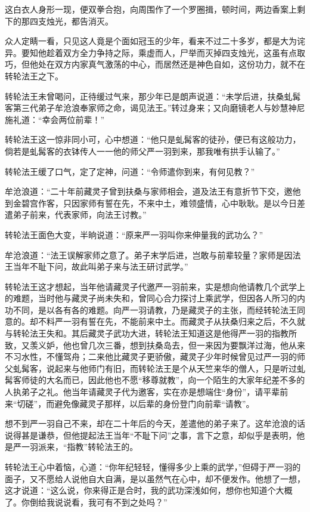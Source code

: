 \documentclass[12pt,oneside]{book}
\begin{document}
这白衣人身形一现，便双拳合抱，向周围作了一个罗圈揖，顿时间，两边香案上剩下的那四支烛光，都告消灭。

众人定睛一看，只见这人竟是个面如冠玉的少年，看来不过二十多岁，都是大为诧异。要知他趁着双方全力争持之际，乘虚而人，尸举而灭掉四支烛光，这虽有点取巧，但他处在双方内家真气激荡的中心，而居然还是神色自如，这份功力，就不在转轮法王之下。

转轮法王未曾喝问，正待缓过气来，那少年已是朗声说道：``未学后进，扶桑虬髯客第三代弟子牟沧浪奉家师之命，谒见法王。''转过身来；又向磨镜老人与妙慧神尼施礼道：``幸会两位前辈！''

转轮法王这一惊非同小可，心中想道：``他只是虬髯客的徒孙，便已有这般功力，倘若是虬髯客的衣钵传人一一他的师父严一羽到来，那我唯有拱手认输了。''

转轮法王缓了口气，定了定神，问道：``令师遣你到来，有何见教？''

牟沧浪道：``二十年前藏灵子曾到扶桑与家师相会，道及法王有意折节下交，邀他到金碧宫作客，只因家师有誓在先，不来中土，难领盛情，心中耿耿。是以今日差遣弟子前来，代表家师，向法王讨教。''

转轮法王面色大变，半晌说道：``原来严一羽叫你来伸量我的武功么？''

牟沧浪道：``法王误解家师之意了。弟子末学后进，岂敢与前辈较量？家师是因法王当年不耻下问，故此叫弟子来与法王研讨武学。''

转轮法王这才想起，当年他请藏灵子代邀严一羽前来，实是想向他请教几个武学上的难题，当时他与藏灵子尚未失和，曾同心合力探讨上乘武学，但因各人所习的内功不同，是以各有各的难题。向严一羽请教，乃是藏灵子的主张，而经转轮法王同意的。却不料严一羽有誓在先，不能前来中土。而藏灵子从扶桑归来之后，不久就与转轮法王失和。其后藏灵子武功大进，转轮法王知道这是他得严一羽的指教所致，又羡义妒，他也曾几次三番，想到扶桑岛去，但一来因为要飘洋过海，他从来不习水性，不懂驾舟；二来他比藏灵子更骄傲，藏灵子少年时候曾见过严一羽的师父虬髯客，说起来与他师门有旧，而转轮法王是个从天竺来华的僧人，只是听过虬髯客师徒的大名而已，因此他也不愿``移尊就教''，向一个陌生的大家年纪差不多的人执弟子之礼。他当年请藏灵子代为邀客，实在亦是想端住``身份''，请平辈前来``切磋''，而避免像藏灵子那样，以后辈的身份登门向前辈``请教''。

想不到严一羽自己不来，却在二十年后的今天，差遣他的弟子来了。这牟沧浪的话说得甚是谦恭，但他提起法王当年``不耻下问''之事，言下之意，却似乎是表明，他是严一羽派来，``指教''转轮法王的。

转轮法王心中着恼，心道：``你年纪轻轻，懂得多少上乘的武学，''但碍于严一羽的面子，又不愿给人说他自大自满，是以虽然气在心中，却不便发作。他想了一想，这才说道：``这么说，你来得正是合时，我的武功深浅如何，想你也知道个大概了。你倒给我说说看，我可有不到之处吗？''
\end{document}
